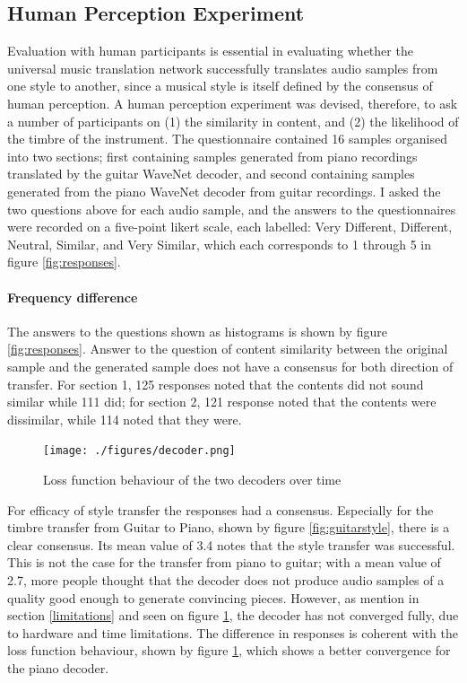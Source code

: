 \documentclass[12pt,a4paper,]{report}
\begin{document}
\hypertarget{human-perception-experiment}{%
\subsection{Human Perception
Experiment}\label{human-perception-experiment}}

Evaluation with human participants is essential in evaluating whether
the universal music translation network successfully translates audio
samples from one style to another, since a musical style is itself
defined by the consensus of human perception. A human perception
experiment was devised, therefore, to ask a number of participants on
(1) the similarity in content, and (2) the likelihood of the timbre of
the instrument. The questionnaire contained 16 samples organised into
two sections; first containing samples generated from piano recordings
translated by the guitar WaveNet decoder, and second containing samples
generated from the piano WaveNet decoder from guitar recordings. I asked
the two questions above for each audio sample, and the answers to the
questionnaires were recorded on a five-point likert scale, each
labelled: Very Different, Different, Neutral, Similar, and Very Similar,
which each corresponds to 1 through 5 in figure \ref{fig:responses}.

\paragraph{Frequency difference}

The answers to the questions shown as histograms is shown by figure
\ref{fig:responses}. Answer to the question of content similarity
between the original sample and the generated sample does not have a
consensus for both direction of transfer. For section 1, 125 responses
noted that the contents did not sound similar while 111 did; for section
2, 121 response noted that the contents were dissimilar, while 114 noted
that they were.

\begin{figure}[!h]
    \texttt{[image: ./figures/decoder.png]}
    \centering
    \caption{Loss function behaviour of the two decoders over time} \label{fig:decoder}
\end{figure}

For efficacy of style transfer the responses had a consensus. Especially
for the timbre transfer from Guitar to Piano, shown by figure
\ref{fig:guitarstyle}, there is a clear consensus. Its mean value of 3.4
notes that the style transfer was successful. This is not the case for
the transfer from piano to guitar; with a mean value of 2.7, more people
thought that the decoder does not produce audio samples of a quality
good enough to generate convincing pieces. However, as mention in
section \ref{limitations} and seen on figure \ref{fig:decoder}, the
decoder has not converged fully, due to hardware and time limitations.
The difference in responses is coherent with the loss function
behaviour, shown by figure \ref{fig:decoder}, which shows a better
convergence for the piano decoder.
\end{document}
